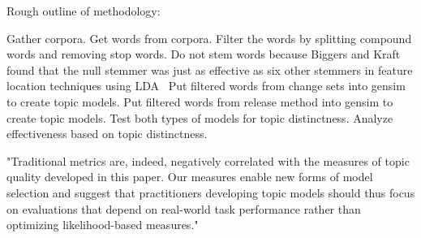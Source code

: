 
Rough outline of methodology:

Gather corpora.
Get words from corpora.
Filter the words by splitting compound words and removing stop words.
Do not stem words because Biggers and Kraft found that the null stemmer was just as effective as six other stemmers in feature location techniques using LDA~\cite{Biggers-Kraft:2012}
Put filtered words from change sets into gensim to create topic models.
Put filtered words from release method into gensim to create topic models.
Test both types of models for topic distinctness.
Analyze effectiveness based on topic distinctness.


"Traditional metrics are, indeed, negatively correlated with the
measures of topic quality developed in this paper.  Our measures enable
new forms of model selection and suggest that practitioners developing
topic models should thus focus on evaluations that depend on real-world
task performance rather than optimizing likelihood-based measures." ~\cite{Chang-etal:2009}

